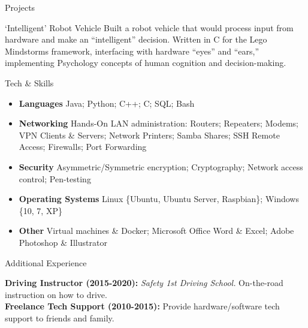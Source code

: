 \documentclass[]{mcdowellcv}
\begin{document}
\begin{cvsection}{Projects}
		\begin{cvsubsection}{‘Intelligent’ Robot Vehicle}{}
			Built a robot vehicle that would process input from hardware and make an “intelligent” decision. \newline  
			Written in C for the Lego Mindstorms framework, interfacing with hardware “eyes” and “ears,” \newline 
			implementing Psychology concepts of human cognition and decision-making. 
		\end{cvsubsection}
	\end{cvsection}
	
	\begin{cvsection}{Tech \& Skills}
		\begin{cvsubsection}{}{}
			\begin{itemize}[itemsep=6pt]
				\item \textbf{Languages} Java; Python; C++; C; SQL; Bash 
				\item \textbf{Networking} Hands-On LAN administration: Routers; Repeaters; Modems; VPN Clients \& Servers; Network Printers; Samba Shares; SSH Remote Access; Firewalls; Port Forwarding 
				\item \textbf{Security} Asymmetric/Symmetric encryption; Cryptography; Network access control; Pen-testing
				\item \textbf{Operating Systems} Linux \{Ubuntu, Ubuntu Server, Raspbian\}; Windows \{10, 7, XP\}
				\item \textbf{Other} Virtual machines \& Docker; Microsoft Office Word \& Excel; Adobe Photoshop \& Illustrator
			\end{itemize}
		\end{cvsubsection}
	\end{cvsection}
	
	\begin{cvsection}{Additional Experience}
		\begin{cvsubsection}{}{}	
			\textbf{Driving Instructor (2015-2020):} \emph{Safety 1st Driving School.} On-the-road instruction on how to drive.\\
			\textbf{Freelance Tech Support (2010-2015):} Provide hardware/software tech support to friends and family.
		\end{cvsubsection}
	\end{cvsection}
	
\end{document}
